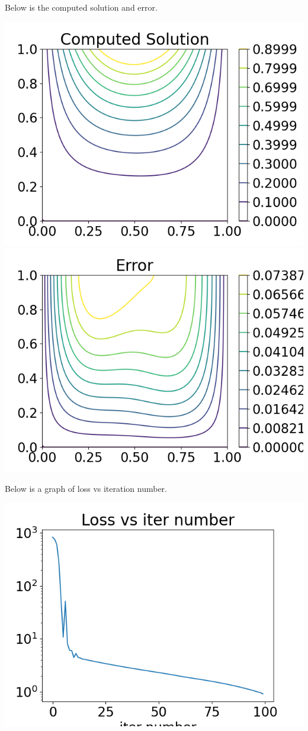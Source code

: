 \documentclass{article}
\begin{document}
\begin{enumerate}
Below is the computed solution and error.
\begin{center}
	\includegraphics[scale=.5]{hw9 sol}
	\includegraphics[scale=.5]{hw9 error}
\end{center}
Below is a graph of loss vs iteration number.
\begin{center}
	\includegraphics[scale=.3]{hw9 loss}
\end{center}




\end{enumerate}
\end{document}
